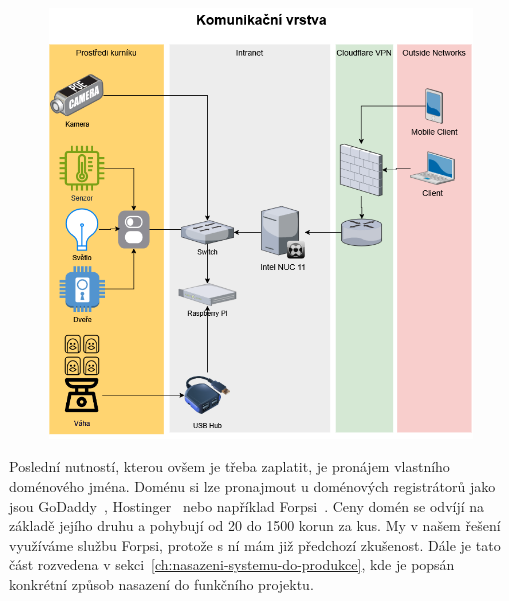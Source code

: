 \begin{figure}[H]
    \centering
    \includegraphics[width=\textwidth]{img/orientacni_topologie}
    \label{fig:orientacni_topologie}
\end{figure}

Poslední nutností, kterou ovšem je třeba zaplatit, je pronájem vlastního doménového jména.
Doménu si lze pronajmout u doménových registrátorů jako jsou GoDaddy~\cite{GoDaddy}, Hostinger~\cite{Hostinger} nebo například Forpsi~\cite{forpsi}.
Ceny domén se odvíjí na základě jejího druhu a pohybují od 20 do 1500 korun za kus.
My v našem řešení využíváme službu Forpsi, protože s ní mám již předchozí zkušenost.\newline
Dále je tato část rozvedena v sekci~\ref{ch:nasazeni-systemu-do-produkce}, kde je popsán konkrétní způsob nasazení do funkčního projektu.




